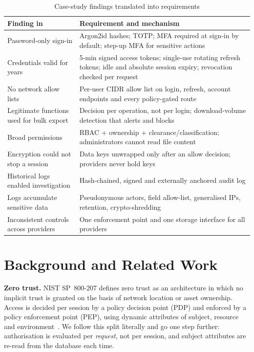 \documentclass[conference]{IEEEtran}
\begin{document}
\begin{table}[t]
\caption{Case-study findings translated into requirements}
\label{tab:req}
\centering
\footnotesize
\begin{tabularx}{\columnwidth}{@{}>{\raggedright\arraybackslash}p{2.55cm}L@{}}
\toprule
Finding in~\cite{casestudy2026} & Requirement and mechanism \\
\midrule
Password-only sign-in & Argon2id hashes; TOTP; MFA required at sign-in by default; step-up MFA for sensitive actions \\
Credentials valid for years & 5-min signed access tokens; single-use rotating refresh tokens; idle and absolute session expiry; revocation checked per request \\
No network allow lists & Per-user CIDR allow list on login, refresh, account endpoints and every policy-gated route \\
Legitimate functions used for bulk export & Decision per operation, not per login; download-volume detection that alerts and blocks \\
Broad permissions & RBAC + ownership + clearance/classification; administrators cannot read file content \\
Encryption could not stop a session & Data keys unwrapped only after an allow decision; providers never hold keys \\
Historical logs enabled investigation & Hash-chained, signed and externally anchored audit log \\
Logs accumulate sensitive data & Pseudonymous actors, field allow-list, generalised IPs, retention, crypto-shredding \\
Inconsistent controls across providers & One enforcement point and one storage interface for all providers \\
\bottomrule
\end{tabularx}
\end{table}

\section{Background and Related Work}
\textbf{Zero trust.} NIST SP~800-207 defines zero trust as an architecture in which no implicit trust is granted on the basis of network location or asset ownership. Access is decided per session by a policy decision point (PDP) and enforced by a policy enforcement point (PEP), using dynamic attributes of subject, resource and environment~\cite{nist800207}. We follow this split literally and go one step further: authorisation is evaluated per \emph{request}, not per session, and subject attributes are re-read from the database each time.
\end{document}
